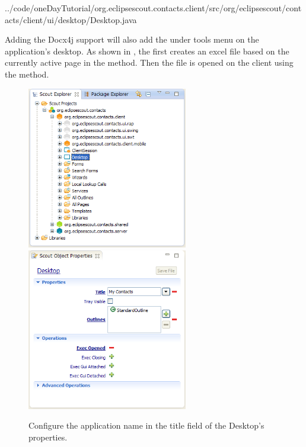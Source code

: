 \documentclass[a4paper,10pt,twoside]{book}
\begin{document}

{../code/oneDayTutorial/org.eclipsescout.contacts.client/src/org/eclipsescout/contacts/client/ui/desktop/Desktop.java}

Adding the Docx4j support will also add the  under tools menu on the application's desktop.
As shown in , the  first creates an excel file based on the currently active page in the  method. 
Then the file is opened on the client using the  method.

\begin{figure}
\includegraphics[width=7cm]{desktop_explorer.png} \hspace{5mm}
\includegraphics[width=7cm]{desktop_properties.png}
\caption{Configure the application name in the title field of the Desktop's properties. }
\end{figure}
\end{document}
